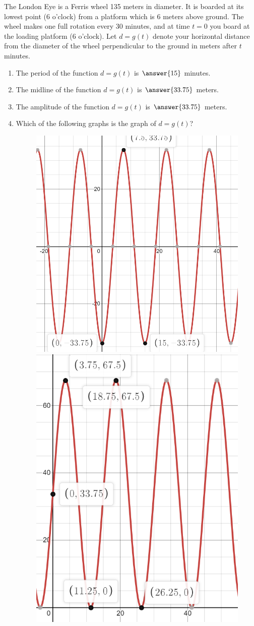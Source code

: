 \documentclass{ximera}
\author{Kenneth Berglund}
\begin{document}
\licenseAPC
\begin{exercise}
The London Eye is a Ferris wheel 135 meters in diameter. It is boarded at its lowest point (6 o'clock) from a platform which is 6 meters above ground. The wheel makes one full rotation every 30 minutes, and at time $t = 0$ you board at the loading platform (6 o'clock). Let $d = g(t)$ denote your horizontal distance from the diameter of the wheel perpendicular to the ground in meters after $t$ minutes.

\begin{enumerate}
\item The period of the function $d = g(t)$ is $\answer{15}$ minutes.

\item The midline of the function $d = g(t)$ is $\answer{33.75}$ meters.

\item The amplitude of the function $d = g(t)$ is $\answer{33.75}$ meters.

\item Which of the following graphs is the graph of $d=g(t)$?
\begin{figure}[!h]
\begin{image}
\includegraphics[width=.4\linewidth]{ex3-a.png}
\hspace{20mm}
\includegraphics[width=.4\linewidth]{ex3-b.png}


\end{image}
\end{figure}
\end{enumerate}
\end{exercise}
\end{document}
